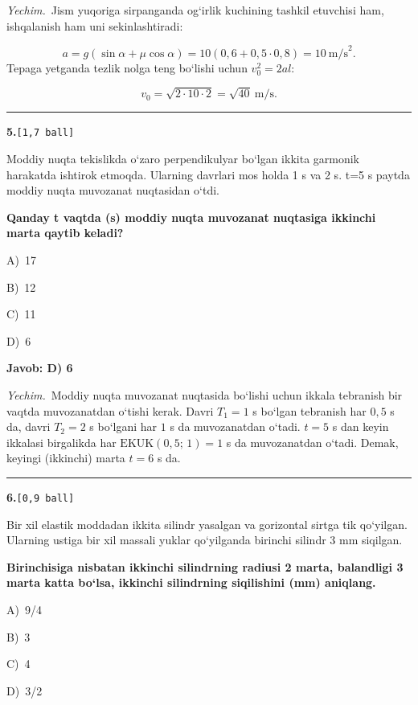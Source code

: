 \documentclass[11pt,a4paper]{article}
\newcommand{\ball}[1]{\hfill\texttt{[#1 ball]}}
\newcommand{\qhead}[2]{\Needspace{10\baselineskip}\noindent\textbf{#1.}\ball{#2}\par\nopagebreak}
\newcommand{\opt}[2]{\hspace*{8mm}#1)\ #2\par}
\newenvironment{qbody}{\begin{list}{}{\leftmargin=8mm\rightmargin=0pt\topsep=0pt\itemsep=0pt\parsep=3pt}\item\relax}{\end{list}}
\begin{document}
\noindent\textit{Yechim.}\ Jism yuqoriga sirpanganda og‘irlik kuchining tashkil etuvchisi ham, ishqalanish ham uni sekinlashtiradi:\par
\[a=g(\sin\alpha+\mu\cos\alpha)=10(0{,}6+0{,}5\cdot0{,}8)=10\ \text{m/s}^2.\]
Tepaga yetganda tezlik nolga teng bo‘lishi uchun $v_0^2=2al$:\par
\[v_0=\sqrt{2\cdot10\cdot2}=\sqrt{40}\ \text{m/s}.\]\par\medskip\hrule\medskip
\noindent\begin{minipage}{\linewidth}
\qhead{5}{1,7}
\begin{qbody}
Moddiy nuqta tekislikda o‘zaro perpendikulyar bo‘lgan ikkita garmonik harakatda ishtirok etmoqda. Ularning davrlari mos holda 1 s va 2 s. t=5 s paytda moddiy nuqta muvozanat nuqtasidan o‘tdi.\par
\textbf{Qanday t vaqtda (s) moddiy nuqta muvozanat nuqtasiga ikkinchi marta qaytib keladi?}\par
\smallskip
\opt{A}{17}
\opt{B}{12}
\opt{C}{11}
\opt{D}{6}
\end{qbody}\end{minipage}\par\vspace{2pt}
\noindent\colorbox{gray!12}{\parbox{\dimexpr\linewidth-2\fboxsep}{\textbf{Javob: D) 6}}}\par\smallskip
\noindent\textit{Yechim.}\ Moddiy nuqta muvozanat nuqtasida bo‘lishi uchun ikkala tebranish bir vaqtda muvozanatdan o‘tishi kerak. Davri $T_1=1$ s bo‘lgan tebranish har $0{,}5$ s da, davri $T_2=2$ s bo‘lgani har $1$ s da muvozanatdan o‘tadi. $t=5$ s dan keyin ikkalasi birgalikda har $\mathrm{EKUK}(0{,}5;\,1)=1$ s da muvozanatdan o‘tadi. Demak, keyingi (ikkinchi) marta $t=6$ s da.\par\par\medskip\hrule\medskip
\noindent\begin{minipage}{\linewidth}
\qhead{6}{0,9}
\begin{qbody}
Bir xil elastik moddadan ikkita silindr yasalgan va gorizontal sirtga tik qo‘yilgan. Ularning ustiga bir xil massali yuklar qo‘yilganda birinchi silindr 3 mm siqilgan.\par
\textbf{Birinchisiga nisbatan ikkinchi silindrning radiusi 2 marta, balandligi 3 marta katta bo‘lsa, ikkinchi silindrning siqilishini (mm) aniqlang.}\par
\smallskip
\opt{A}{9/4}
\opt{B}{3}
\opt{C}{4}
\opt{D}{3/2}
\end{qbody}\end{minipage}\par\vspace{2pt}
\end{document}
